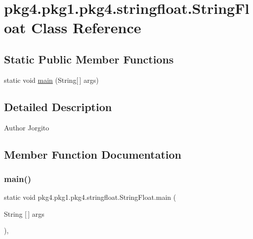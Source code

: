 \hypertarget{classpkg4_1_1pkg1_1_1pkg4_1_1stringfloat_1_1_string_float}{}\section{pkg4.\+pkg1.\+pkg4.\+stringfloat.\+String\+Float Class Reference}
\label{classpkg4_1_1pkg1_1_1pkg4_1_1stringfloat_1_1_string_float}
\subsection*{Static Public Member Functions}
\begin{DoxyCompactItemize}
\item 
static void \mbox{\hyperlink{classpkg4_1_1pkg1_1_1pkg4_1_1stringfloat_1_1_string_float_a3412192ef8b7f2857ce55ae22443555a}{main}} (String\mbox{[}$\,$\mbox{]} args)
\end{DoxyCompactItemize}


\subsection{Detailed Description}
\begin{DoxyAuthor}{Author}
Jorgito 
\end{DoxyAuthor}


\subsection{Member Function Documentation}
\mbox{\label{classpkg4_1_1pkg1_1_1pkg4_1_1stringfloat_1_1_string_float_a3412192ef8b7f2857ce55ae22443555a}} 
\subsubsection{\texorpdfstring{main()}{main()}}
{\footnotesize\ttfamily static void pkg4.\+pkg1.\+pkg4.\+stringfloat.\+String\+Float.\+main (\begin{DoxyParamCaption}\item[{String \mbox{[}$\,$\mbox{]}}]{args }\end{DoxyParamCaption})\hspace{0.3cm}{\ttfamily [inline]}, {\ttfamily [static]}}


